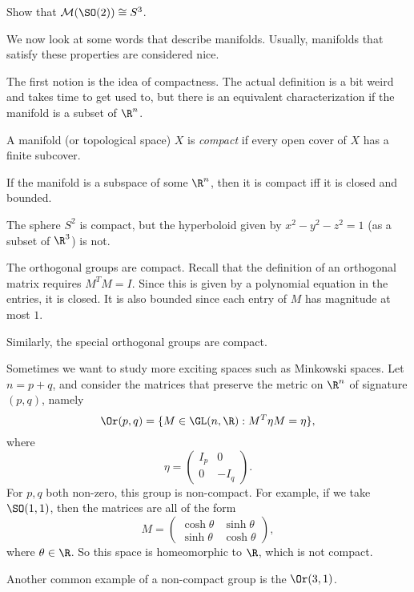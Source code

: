 \documentclass[a4paper]{article}
\begin{document}
\begin{ex}
  Show that $\mathcal{M}(\SO(2)) \cong S^3$.
\end{ex}

We now look at some words that describe manifolds. Usually, manifolds that satisfy these properties are considered nice.

The first notion is the idea of compactness. The actual definition is a bit weird and takes time to get used to, but there is an equivalent characterization if the manifold is a subset of $\R^n$.
\begin{defi}[Compact]
  A manifold (or topological space) $X$ is \emph{compact} if every open cover of $X$ has a finite subcover.

  If the manifold is a subspace of some $\R^n$, then it is compact iff it is closed and bounded.
\end{defi}

\begin{eg}
  The sphere $S^2$ is compact, but the hyperboloid given by $x^2 - y^2 - z^2 = 1$ (as a subset of $\R^3$) is not.
\end{eg}

\begin{eg}
  The orthogonal groups are compact. Recall that the definition of an orthogonal matrix requires $M^T M = I$. Since this is given by a polynomial equation in the entries, it is closed. It is also bounded since each entry of $M$ has magnitude at most $1$.

  Similarly, the special orthogonal groups are compact.
\end{eg}

\begin{eg}
  Sometimes we want to study more exciting spaces such as Minkowski spaces. Let $n = p + q$, and consider the matrices that preserve the metric on $\R^n$ of signature $(p, q)$, namely
  \[
    \Or(p, q) = \{M \in \GL(n, \R): M^T \eta M = \eta\},
  \]
  where
  \[
    \eta =
    \begin{pmatrix}
      I_p & 0\\
      0 & -I_q
    \end{pmatrix}.
  \]
  For $p, q$ both non-zero, this group is non-compact. For example, if we take $\SO(1, 1)$, then the matrices are all of the form
  \[
    M =
    \begin{pmatrix}
      \cosh\theta & \sinh \theta\\
      \sinh \theta & \cosh \theta
    \end{pmatrix},
  \]
  where $\theta \in \R$. So this space is homeomorphic to $\R$, which is not compact.

  Another common example of a non-compact group is the  $\Or(3, 1)$.
\end{eg}
\end{document}

